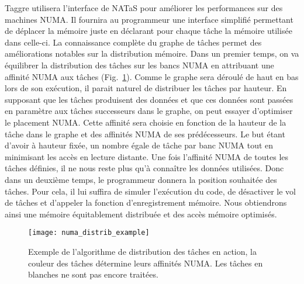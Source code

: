 Taggre utilisera l'interface de NATaS pour améliorer les performances sur des machines NUMA.
%
Il fournira au programmeur une interface simplifié permettant de déplacer la mémoire juste en déclarant pour chaque tâche la mémoire utilisée dans celle-ci.
%
La connaissance complète du graphe de tâches permet des améliorations notables sur la distribution mémoire.
%
Dans un premier temps, on va équilibrer la distribution des tâches sur les bancs NUMA en attribuant une affinité NUMA aux tâches (Fig.~\ref{fig:numa_distrib_example}).
%
Comme le graphe sera déroulé de haut en bas lors de son exécution, il parait naturel de distribuer les tâches par hauteur.
%
En supposant que les tâches produisent des données et que ces données sont passées en paramètre aux tâches successeurs dans le graphe, on peut essayer d'optimiser le placement NUMA.
%
Cette affinité sera choisie en fonction de la hauteur de la tâche dans le graphe et des affinités NUMA de ses prédécesseurs.
%
Le but étant d'avoir à hauteur fixée, un nombre égale de tâche par banc NUMA tout en minimisant les accès en lecture distante.
%
Une fois l'affinité NUMA de toutes les tâches définies, il ne nous reste plus qu'à connaître les données utilisées.
%
Donc dans un deuxième temps, le programmeur donnera la position souhaitée des tâches.
%
Pour cela, il lui suffira de simuler l'exécution du code, de désactiver le vol de tâches et d'appeler la fonction d'enregistrement mémoire.
%
Nous obtiendrons ainsi une mémoire équitablement distribuée et des accès mémoire optimisés.





\begin{figure}[!h]
  \centering
  \texttt{[image: numa\_distrib\_example]}
  \caption{Exemple de l'algorithme de distribution des tâches en action, la couleur des tâches détermine leurs affinités NUMA. Les tâches en blanches ne sont pas encore traitées.}
  \label{fig:numa_distrib_example}
\end{figure}
